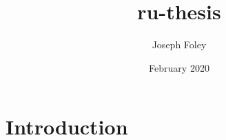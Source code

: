 \documentclass{article}
\title{ru-thesis}
\author{Joseph Foley}
\date{February 2020}
\begin{document}
\maketitle

\section{Introduction}
\end{document}
